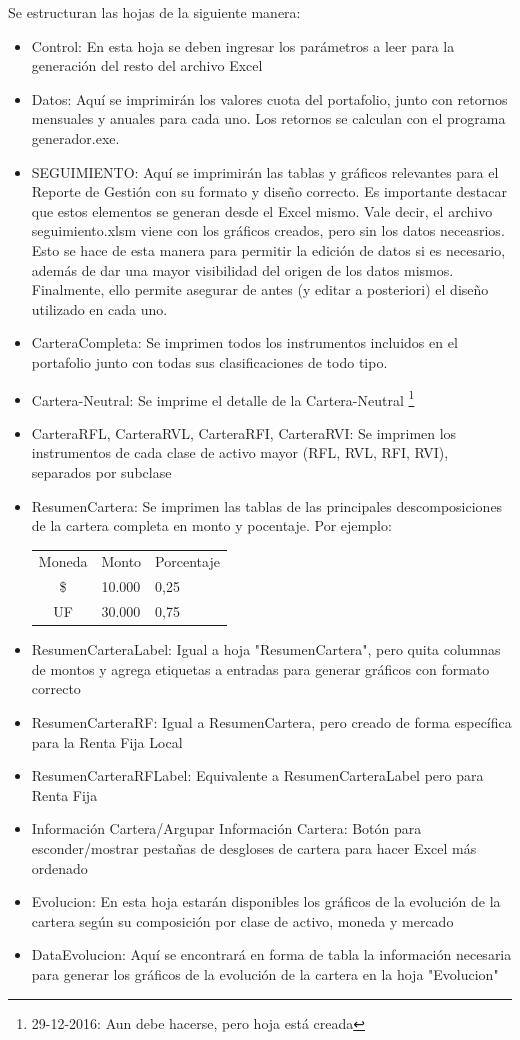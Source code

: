 \documentclass{article}
\begin{document}
Se estructuran las hojas de la siguiente manera:
\begin{itemize}
\item Control: En esta hoja se deben ingresar los parámetros a leer para la generación del resto del archivo Excel
\item Datos: Aquí se imprimirán los valores cuota del portafolio, junto con retornos mensuales y anuales para cada uno. Los retornos se calculan con el programa generador.exe. 
\item SEGUIMIENTO: Aquí se imprimirán las tablas y gráficos relevantes para el Reporte de Gestión con su formato y diseño correcto. Es importante destacar que estos elementos se generan desde el Excel mismo. Vale decir, el archivo seguimiento.xlsm viene con los gráficos creados, pero sin los datos neceasrios. Esto se hace de esta manera para permitir la edición de datos si es necesario, además de dar una mayor visibilidad del origen de los datos mismos. Finalmente, ello permite asegurar de antes (y editar a posteriori) el diseño utilizado en cada uno.
\item CarteraCompleta: Se imprimen todos los instrumentos incluidos en el portafolio junto con todas sus clasificaciones de todo tipo.
\item Cartera-Neutral: Se imprime el detalle de la Cartera-Neutral \footnote{29-12-2016: Aun debe hacerse, pero hoja está creada}
\item CarteraRFL, CarteraRVL, CarteraRFI, CarteraRVI: Se imprimen los instrumentos de cada clase de activo mayor (RFL, RVL, RFI, RVI), separados por subclase
\item ResumenCartera: Se imprimen las tablas de las principales descomposiciones de la cartera completa en monto y pocentaje. Por ejemplo:
\begin{table}[h!]
\centering
\begin{tabular}{cll}
Moneda & Monto  & Porcentaje \\
\$      & 10.000 & 0,25      \\
UF     & 30.000 & 0,75      
\end{tabular}
\end{table}

\item ResumenCarteraLabel: Igual a hoja "ResumenCartera", pero quita columnas de montos y agrega etiquetas a entradas para generar gráficos con formato correcto

\item ResumenCarteraRF: Igual a ResumenCartera, pero creado de forma específica para la Renta Fija Local
\item ResumenCarteraRFLabel: Equivalente a ResumenCarteraLabel pero para Renta Fija
\item Información Cartera/Argupar Información Cartera: Botón para esconder/mostrar pestañas de desgloses de cartera para hacer Excel más ordenado
\item Evolucion: En esta hoja estarán disponibles los gráficos de la evolución de la cartera según su composición por clase de activo, moneda y mercado
\item DataEvolucion: Aquí se encontrará en forma de tabla la información necesaria para generar los gráficos de la evolución de la cartera en la hoja "Evolucion"


\end{itemize}
\end{document}
